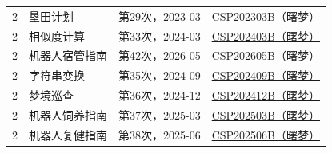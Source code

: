\begin{longtable}{P{1cm}P{3.7cm}P{2.8cm}P{6cm}}
2 & 垦田计划 & 第29次，2023-03 & \href{https://oj.shumeng.tech/p/CSP202303B}{CSP202303B（曙梦）}\\
2 & 相似度计算 & 第33次，2024-03 & \href{https://oj.shumeng.tech/p/CSP202403B}{CSP202403B（曙梦）}\\
2 & 机器人宿管指南 & 第42次，2026-05 & \href{https://oj.shumeng.tech/p/CSP202605B}{CSP202605B（曙梦）}\\
2 & 字符串变换 & 第35次，2024-09 & \href{https://oj.shumeng.tech/p/CSP202409B}{CSP202409B（曙梦）}\\
2 & 梦境巡查 & 第36次，2024-12 & \href{https://oj.shumeng.tech/p/CSP202412B}{CSP202412B（曙梦）}\\
2 & 机器人饲养指南 & 第37次，2025-03 & \href{https://oj.shumeng.tech/p/CSP202503B}{CSP202503B（曙梦）}\\
2 & 机器人复健指南 & 第38次，2025-06 & \href{https://oj.shumeng.tech/p/CSP202506B}{CSP202506B（曙梦）}\\
\bottomrule\end{longtable}
